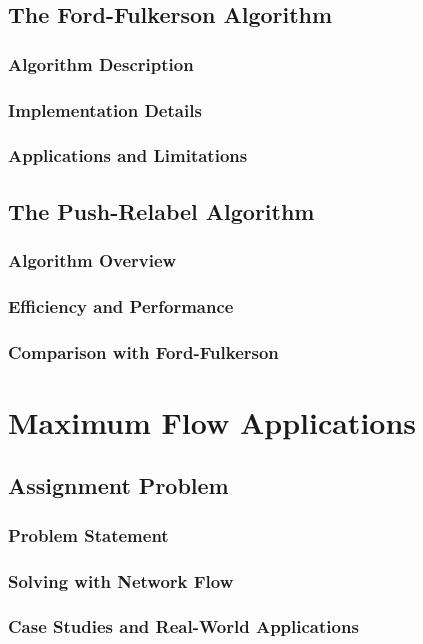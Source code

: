 \documentclass[12pt]{book} %
\begin{document}
\subsection{The Ford-Fulkerson Algorithm}
\subsubsection{Algorithm Description}
\subsubsection{Implementation Details}
\subsubsection{Applications and Limitations}
\subsection{The Push-Relabel Algorithm}
\subsubsection{Algorithm Overview}
\subsubsection{Efficiency and Performance}
\subsubsection{Comparison with Ford-Fulkerson}

\section{Maximum Flow Applications}
\subsection{Assignment Problem}
\subsubsection{Problem Statement}
\subsubsection{Solving with Network Flow}
\subsubsection{Case Studies and Real-World Applications}
\end{document}
